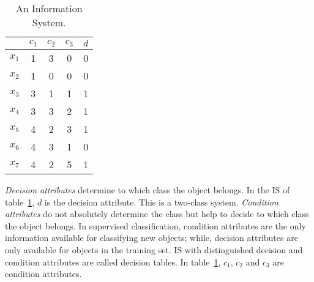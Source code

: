 \documentclass[authoryear,11pt]{elsarticle}
\begin{document}
  
 \begin{table}[htb]
		\caption{An Information System.} \label{tab_IS}
		\centering
 	\begin{tabular}{c||c|c|c||c}
 			  & $c_1$ & $c_2$ &  $c_3$ & $d$ \\
 		\hline \hline
		$x_1$ &   1   &    3  &  0  &   0   \\
		$x_2$ &   1   &    0  &  0  &   0   \\
		$x_3$ &   3   &    1  &  1  &   1   \\
		$x_4$ &   3   &    3  &  2  &   1   \\
		$x_5$ &   4   &    2  &  3  &   1   \\
		$x_6$ &   4   &    3  &  1  &   0   \\
		$x_7$ &   4   &    2  &  5  &   1   \\
 	\end{tabular}             
 \end{table}
 
   
  \textit{Decision attributes} determine to which class the object belongs. In the IS of
  table~\ref{tab_IS}, $d$ is the decision attribute. 
  This is a two-class system. \textit{Condition attributes} do not absolutely determine the class but help 
  to decide to which class the object belongs. In supervised classification, condition attributes are the 
  only information available for classifying new objects; while, decision attributes are only 
  available for objects in the training set. IS with distinguished decision and condition attributes are 
  called decision tables. In table~\ref{tab_IS}, $c_1$, $c_2$ and $c_3$ are condition attributes.
 
\end{document}
